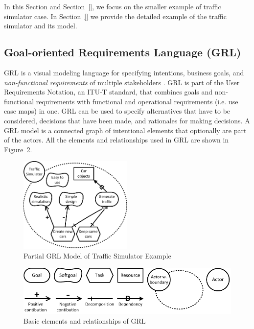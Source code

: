 In this Section and Section~\ref{}, we focus on the smaller example of traffic simulator case. In Section~\ref{} we provide the detailed example of the traffic simulator and its model. 

\subsection{Goal-oriented Requirements Language (GRL)}
\label{sect:background:grl}
GRL is a visual modeling language for specifying intentions, business goals, and \emph{non-functional requirements} of multiple stakeholders \cite{Amyot:2010:EGM:1841349.1841356}. GRL is part of the User Requirements Notation, an ITU-T standard, that combines goals and non-functional requirements with functional and operational requirements (i.e. use case maps) in one. GRL can be used to specify alternatives that have to be considered, decisions that have been made, and rationales for making decisions. A GRL model is a connected graph of intentional elements that optionally are part of the actors. All the elements and relationships used in GRL are shown in Figure~\ref{fig:grl_legend}.

\begin{figure}[ht]
\centering
\includegraphics[width=0.5\textwidth]{img/Example1}
\caption{Partial GRL Model of Traffic Simulator Example} %
\label{fig:example-small}
\end{figure} %

\begin{figure}[ht]
\centering
\includegraphics[scale=0.6]{img/grl_legend}
\caption{Basic elements and relationships of GRL}
\label{fig:grl_legend}
\end{figure}

